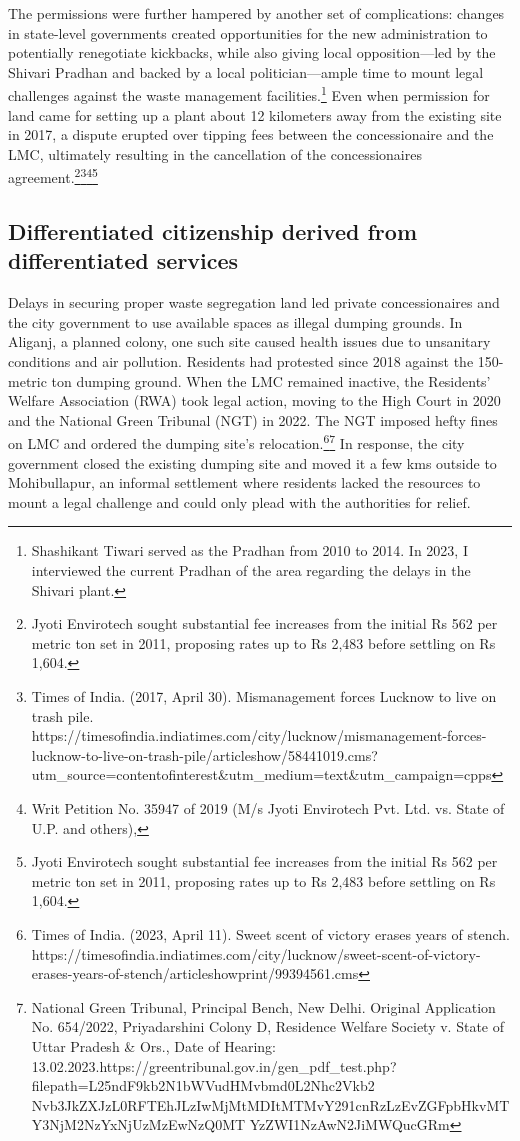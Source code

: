 The permissions were further hampered by another set of complications: changes in state-level governments created opportunities for the new administration to potentially renegotiate kickbacks, while also giving local opposition—led by the Shivari Pradhan and backed by a local politician—ample time to mount legal challenges against the waste management facilities.\footnote{Shashikant Tiwari served as the Pradhan from 2010 to 2014. In 2023, I interviewed the current Pradhan of the area regarding the delays in the Shivari plant.} Even when permission for land came for setting up a plant about 12 kilometers away from the existing site in 2017, a dispute erupted over tipping fees between the concessionaire and the LMC, ultimately resulting in the cancellation of the concessionaires agreement.\footnote{Jyoti Envirotech sought substantial fee increases from the initial Rs 562 per metric ton set in 2011, proposing rates up to Rs 2,483 before settling on Rs 1,604.}\footnote{Times of India. (2017, April 30). Mismanagement forces Lucknow to live on trash pile. https://timesofindia.indiatimes.com/city/lucknow/mismanagement-forces-lucknow-to-live-on-trash-pile/articleshow/58441019.cms?utm\_source=contentofinterest\&utm\_medium=text\&utm\_campaign=cpps}\footnote{Writ Petition No. 35947 of 2019 (M/s Jyoti Envirotech Pvt. Ltd. vs. State of U.P. and others),}\footnote{Jyoti Envirotech sought substantial fee increases from the initial Rs 562 per metric ton set in 2011, proposing rates up to Rs 2,483 before settling on Rs 1,604.}

\subsection{Differentiated citizenship derived from differentiated services}

Delays in securing proper waste segregation land led private concessionaires and the city government to use available spaces as illegal dumping grounds. In Aliganj, a planned colony, one such site caused health issues due to unsanitary conditions and air pollution. Residents had protested since 2018 against the 150-metric ton dumping ground. When the LMC remained inactive, the Residents' Welfare Association (RWA) took legal action, moving to the High Court in 2020 and the National Green Tribunal (NGT) in 2022. The NGT imposed hefty fines on LMC and ordered the dumping site's relocation.\footnote{Times of India. (2023, April 11). Sweet scent of victory erases years of stench. https://timesofindia.indiatimes.com/city/lucknow/sweet-scent-of-victory-erases-years-of-stench/articleshowprint/99394561.cms}\footnote{National Green Tribunal, Principal Bench, New Delhi. Original Application No. 654/2022, Priyadarshini Colony D, Residence Welfare Society v. State of Uttar Pradesh \& Ors., Date of Hearing: 13.02.2023.https://greentribunal.gov.in/gen\_pdf\_test.php?filepath=L25ndF9kb2N1bWVudHMvbmd0L2Nhc2Vkb2 Nvb3JkZXJzL0RFTEhJLzIwMjMtMDItMTMvY291cnRzLzEvZGFpbHkvMTY3NjM2NzYxNjUzMzEwNzQ0MT YzZWI1NzAwN2JiMWQucGRm} In response, the city government closed the existing dumping site and moved it a few kms outside to Mohibullapur, an informal settlement where residents lacked the resources to mount a legal challenge and could only plead with the authorities for relief.

